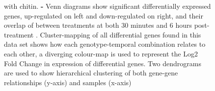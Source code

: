 \documentclass[../main.tex]{subfiles}
\begin{document}
\begin{figure}[!t]
{    with chitin. \textbf{\protect{} -
      \protect{}} Venn diagrams show significant
    differentially expressed genes, up-regulated on left and
    down-regulated on right, and their overlap of between treatments
    at both 30 minutes \textbf{\protect{}} and 6
    hours post-treatment
    \textbf{\protect{}}. \textbf{\protect{}}
    Cluster-mapping of all differential genes found in this data set
    shows how each genotype-temporal combination relates to each
    other, a diverging colour-map is used to represent the Log2 Fold
    Change in expression of differential genes. Two dendrograms are
    used to show hierarchical clustering of both gene-gene
    relationships (y-axis) and samples (x-axis)}
\end{figure}







\end{document}
